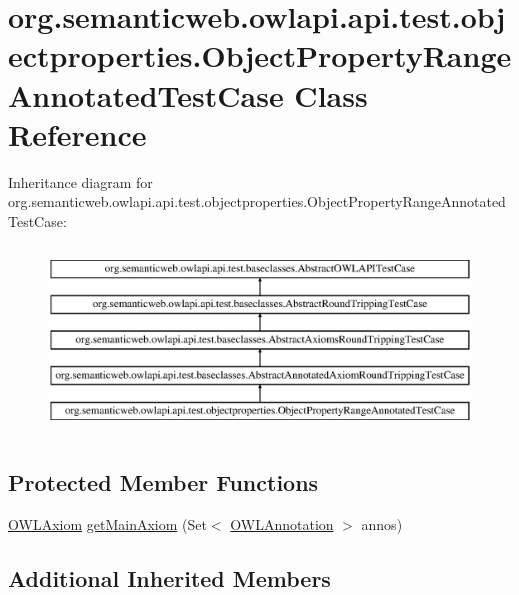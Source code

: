 \hypertarget{classorg_1_1semanticweb_1_1owlapi_1_1api_1_1test_1_1objectproperties_1_1_object_property_range_annotated_test_case}{\section{org.\-semanticweb.\-owlapi.\-api.\-test.\-objectproperties.\-Object\-Property\-Range\-Annotated\-Test\-Case Class Reference}
\label{classorg_1_1semanticweb_1_1owlapi_1_1api_1_1test_1_1objectproperties_1_1_object_property_range_annotated_test_case}
}
Inheritance diagram for org.\-semanticweb.\-owlapi.\-api.\-test.\-objectproperties.\-Object\-Property\-Range\-Annotated\-Test\-Case\-:\begin{figure}[H]
\begin{center}
\leavevmode
\includegraphics[height=5.000000cm]{classorg_1_1semanticweb_1_1owlapi_1_1api_1_1test_1_1objectproperties_1_1_object_property_range_annotated_test_case}
\end{center}
\end{figure}
\subsection*{Protected Member Functions}
\begin{DoxyCompactItemize}
\item 
\hyperlink{interfaceorg_1_1semanticweb_1_1owlapi_1_1model_1_1_o_w_l_axiom}{O\-W\-L\-Axiom} \hyperlink{classorg_1_1semanticweb_1_1owlapi_1_1api_1_1test_1_1objectproperties_1_1_object_property_range_annotated_test_case_ac333917e7cfcf63921c0b6ec90c5e570}{get\-Main\-Axiom} (Set$<$ \hyperlink{interfaceorg_1_1semanticweb_1_1owlapi_1_1model_1_1_o_w_l_annotation}{O\-W\-L\-Annotation} $>$ annos)
\end{DoxyCompactItemize}
\subsection*{Additional Inherited Members}


